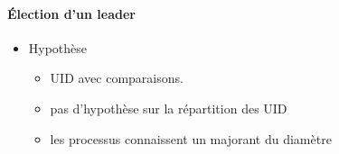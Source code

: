 \documentclass{article}
\begin{document}
\paragraph{Élection d'un leader}
\begin{itemize}
\item Hypothèse
\begin{itemize}
\item UID avec comparaisons.
\item pas d'hypothèse sur la répartition des UID
\item les processus connaissent un majorant du diamètre
\end{itemize}
\end{itemize}
\end{document}
